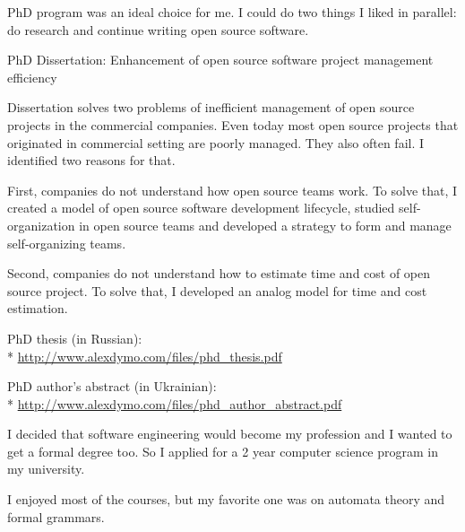 \documentclass[12pt]{letter}
\begin{document}
\begin{llist}
  \startexperience

            \item PhD program was an ideal choice for me. I could do two things I liked in parallel: do research and continue writing open source software.

            \item PhD Dissertation: Enhancement of open source software project management efficiency

            \item Dissertation solves two problems of inefficient management of open source projects in the commercial companies. Even today most open source projects that originated in commercial setting are poorly managed. They also often fail. I identified two reasons for that.

            \item First, companies do not understand how open source teams work. To solve that, I created a model of open source software development lifecycle, studied self-organization in open source teams and developed a strategy to form and manage self-organizing teams.

            \item Second, companies do not understand how to estimate time and cost of open source project. To solve that, I developed an analog model for time and cost estimation.

            \item PhD thesis (in Russian):\\*
            \url{http://www.alexdymo.com/files/phd_thesis.pdf}
            \item PhD author's abstract (in Ukrainian):\\* \url{http://www.alexdymo.com/files/phd_author_abstract.pdf}

  \endexperience


  \startexperience

            \item I decided that software engineering would become my profession and I wanted to get a formal degree too. So I applied for a 2 year computer science program in my university.

            \item I enjoyed most of the courses, but my favorite one was on automata theory and formal grammars.


\end{llist}
\end{document}
